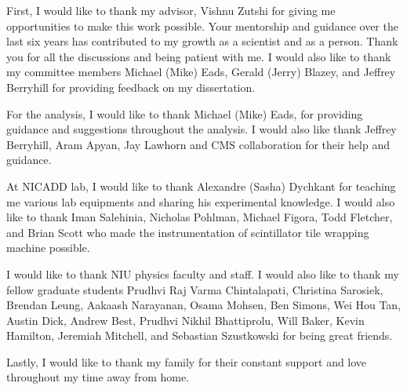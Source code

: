 First, I would like to thank my advisor, Vishnu Zutshi
for giving me opportunities to make this work possible.
Your mentorship and guidance over the last six years has
contributed to my growth as a scientist and as a person. Thank you
for all the discussions and being patient with me.
I would also like to thank my committee members Michael (Mike) Eads,
Gerald (Jerry) Blazey, and Jeffrey Berryhill for providing feedback
on my dissertation.

For the analysis, I would like to thank Michael (Mike) Eads, for providing
guidance and suggestions throughout the analysis.
I would also like thank Jeffrey Berryhill, Aram Apyan, Jay Lawhorn
and CMS collaboration for their help and guidance.


At NICADD lab, I would like to thank Alexandre (Sasha) Dychkant for
teaching me various lab equipments and sharing his experimental knowledge.
I would also like to thank
Iman Salehinia, Nicholas Pohlman, Michael Figora, Todd Fletcher,
and Brian Scott who made the instrumentation of
scintillator tile wrapping machine possible.

I would like to thank NIU physics faculty and staff. I would also
like to thank my fellow graduate students
Prudhvi Raj Varma Chintalapati,
Christina Sarosiek,
Brendan Leung,
Aakaash Narayanan,
Osama Mohsen,
Ben Simons,
Wei Hou Tan,
Austin Dick,
Andrew Best,
Prudhvi Nikhil Bhattiprolu,
Will Baker,
Kevin Hamilton,
Jeremiah Mitchell,
and Sebastian Szustkowski
for being great friends.


Lastly, I would like to thank my family for their constant
support and love throughout my time away from home.